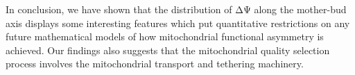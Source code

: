 In conclusion, we have shown that the distribution of ΔΨ along the mother-bud axis displays some interesting features which put quantitative restrictions on any future mathematical models of how mitochondrial functional asymmetry is achieved. Our findings also suggests that the mitochondrial quality selection process involves the mitochondrial transport and tethering machinery. 

